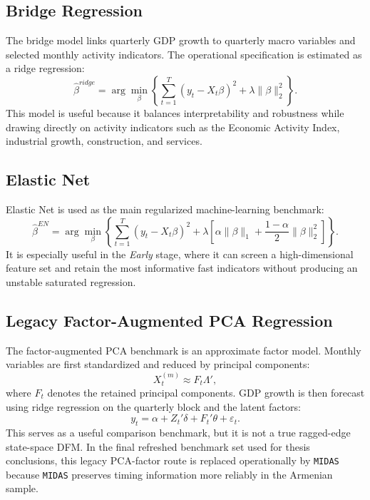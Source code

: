 \documentclass[12pt,a4paper]{report}
\begin{document}
\subsection{Bridge Regression}

The bridge model links quarterly GDP growth to quarterly macro variables and selected monthly activity indicators. The operational specification is estimated as a ridge regression:
\begin{equation}
    \hat{\beta}^{ridge} = \arg\min_{\beta} \left\{ \sum_{t=1}^{T}(y_t - X_t \beta)^2 + \lambda \|\beta\|_2^2 \right\}.
\end{equation}
This model is useful because it balances interpretability and robustness while drawing directly on activity indicators such as the Economic Activity Index, industrial growth, construction, and services.

\subsection{Elastic Net}

Elastic Net is used as the main regularized machine-learning benchmark:
\begin{equation}
    \hat{\beta}^{EN} = \arg\min_{\beta} \left\{ \sum_{t=1}^{T}(y_t - X_t \beta)^2 + \lambda \left[ \alpha \|\beta\|_1 + \frac{1-\alpha}{2}\|\beta\|_2^2 \right] \right\}.
\end{equation}
It is especially useful in the \textit{Early} stage, where it can screen a high-dimensional feature set and retain the most informative fast indicators without producing an unstable saturated regression.

\subsection{Legacy Factor-Augmented PCA Regression}

The factor-augmented PCA benchmark is an approximate factor model. Monthly variables are first standardized and reduced by principal components:
\begin{equation}
    X^{(m)}_t \approx F_t \Lambda',
\end{equation}
where $F_t$ denotes the retained principal components. GDP growth is then forecast using ridge regression on the quarterly block and the latent factors:
\begin{equation}
    y_t = \alpha + Z_t' \delta + F_t' \theta + \varepsilon_t.
\end{equation}
This serves as a useful comparison benchmark, but it is not a true ragged-edge state-space DFM. In the final refreshed benchmark set used for thesis conclusions, this legacy PCA-factor route is replaced operationally by \texttt{MIDAS} because \texttt{MIDAS} preserves timing information more reliably in the Armenian sample.
\end{document}
